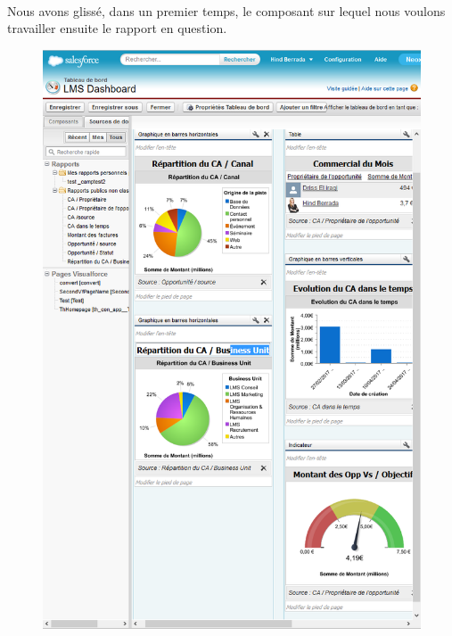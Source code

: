 \documentclass[a4paper, 12pt]{report}
\begin{document}
\begin{itemize}
\paragraph{}
Nous avons glissé, dans un premier temps, le composant sur lequel nous voulons travailler ensuite le rapport en question.
\begin{figure}[H]
	\centering
		\includegraphics{dashbord.PNG}
	\label{fig:Exemples des tableaux de bord}
\end{figure}

\end{itemize}
\end{document}
